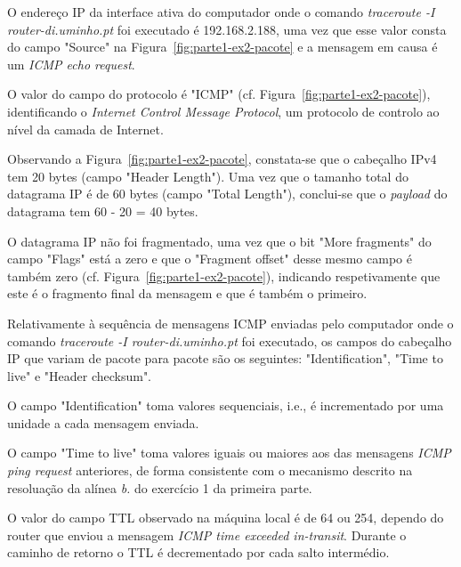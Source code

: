 O endereço IP da interface ativa do computador onde o comando \emph{traceroute
-I router-di.uminho.pt} foi executado é 192.168.2.188, uma vez que esse valor
consta do campo "Source" na Figura~\ref{fig:parte1-ex2-pacote} e a mensagem em
causa é um \emph{ICMP echo request}.


O valor do campo do protocolo é "ICMP" (cf. Figura~\ref{fig:parte1-ex2-pacote}),
identificando o \emph{Internet Control Message Protocol}, um protocolo de
controlo ao nível da camada de Internet.


Observando a Figura~\ref{fig:parte1-ex2-pacote}, constata-se que o cabeçalho
IPv4 tem 20 bytes (campo "Header Length"). Uma vez que o tamanho total do
datagrama IP é de 60 bytes (campo "Total Length"), conclui-se que o
\emph{payload} do datagrama tem 60 - 20 = 40 bytes.


O datagrama IP não foi fragmentado, uma vez que o bit "More fragments" do campo
"Flags" está a zero e que o "Fragment offset" desse mesmo campo é também zero
(cf. Figura~\ref{fig:parte1-ex2-pacote}), indicando respetivamente que este é o
fragmento final da mensagem e que é também o primeiro.


Relativamente à sequência de mensagens ICMP enviadas pelo computador onde o
comando \emph{traceroute -I router-di.uminho.pt} foi executado, os campos do
cabeçalho IP que variam de pacote para pacote são os seguintes:
"Identification", "Time to live" e "Header checksum".


O campo "Identification" toma valores sequenciais, i.e., é incrementado por uma
unidade a cada mensagem enviada.

O campo "Time to live" toma valores iguais ou maiores aos das mensagens
\emph{ICMP ping request} anteriores, de forma consistente com o mecanismo
descrito na resoluação da alínea \emph{b.} do exercício 1 da primeira parte.


O valor do campo TTL observado na máquina local é de 64 ou 254, dependo do
router que enviou a mensagem \emph{ICMP time exceeded in-transit}. Durante o
caminho de retorno o TTL é decrementado por cada salto intermédio.


